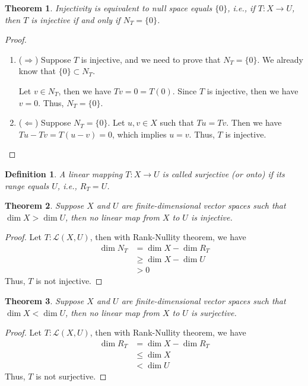 \documentclass[11pt]{book}
\newtheorem{definition}{Definition}[section]
\newtheorem{theorem}{Theorem}[section]
\theoremstyle{definition}
\numberwithin{equation}{subsection}
\begin{document}
\medskip

\begin{theorem}
Injectivity is equivalent to null space equals $\{0\}$, i.e., if $T:X\to U$, then $T$ is injective if and only if $N_T = \{0\}$.
\end{theorem}
\begin{proof}
~\begin{enumerate}[label=(\arabic*)]
    \item ($\Rightarrow$) Suppose $T$ is injective, and we need to prove that $N_T = \{0\}$. We already know that $\{0\}\subset N_T$. 
    
    Let $v\in N_T$, then we have $Tv = 0 = T(0)$. Since $T$ is injective, then we have $v = 0$. Thus, $N_T = \{0\}$.
    \item ($\Leftarrow$) Suppose $N_T = \{0\}$. Let $u,v\in X$ such that $Tu = Tv$. Then we have $Tu - Tv = T(u - v) = 0$, which implies $u = v$. Thus, $T$ is injective.
\end{enumerate}
\end{proof}

\medskip

\begin{definition}
A linear mapping $T:X\to U$ is called surjective (or onto) if its range equals $U$, i.e., $R_T = U$.
\end{definition}

\medskip

\begin{theorem}
Suppose $X$ and $U$ are finite-dimensional vector spaces such that $\dim X > \dim U$, then no linear map from $X$ to $U$ is injective.
\end{theorem}
\begin{proof}
Let $T:\mathscr{L}(X,U)$, then with Rank-Nullity theorem, we have
\begin{align*}
    \dim N_T & = \dim X - \dim R_T \\
    & \geq \dim X - \dim U \\
    & > 0
\end{align*}
Thus, $T$ is not injective.
\end{proof}

\medskip

\begin{theorem}
Suppose $X$ and $U$ are finite-dimensional vector spaces such that $\dim X < \dim U$, then no linear map from $X$ to $U$ is surjective.
\end{theorem}
\begin{proof}
Let $T:\mathscr{L}(X,U)$, then with Rank-Nullity theorem, we have
\begin{align*}
    \dim R_T & = \dim X - \dim R_T \\
    & \leq \dim X \\
    & < \dim U
\end{align*}
Thus, $T$ is not surjective.
\end{proof}
\end{document}
